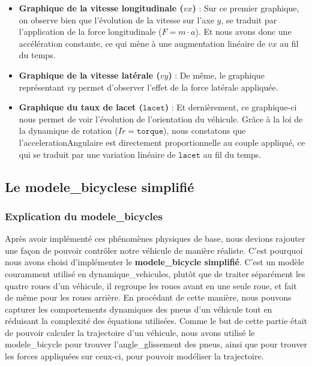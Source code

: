 \begin{itemize}
    \item \textbf{Graphique de la vitesse longitudinale ($vx$)} : Sur ce premier graphique, on observe bien que l'évolution de la vitesse sur l'axe $y$, se traduit par l'application de la force longitudinale ($ F = m \cdot a $).
    Et nous avons donc une accélération constante, ce qui mène à une augmentation linéaire de $vx$ au fil du temps.

    \item \textbf{Graphique de la vitesse latérale ($vy$)} : De même, le graphique représentant $vy$ permet d'observer l'effet de la force latérale appliquée.

    \item \textbf{Graphique du taux de lacet ({$\texttt{lacet}$})} : Et dernièrement, ce graphique-ci nous permet de voir l'évolution de l'orientation du véhicule.
    Grâce à la loi de la dynamique de rotation ($I\dot{r} = \texttt{torque}$), nous constatons que l'\gls{accelerationAngulaire} est directement proportionnelle au couple appliqué, ce qui se traduit par une variation linéaire de $\texttt{lacet}$ au fil du temps.
\end{itemize}

\subsection{Le \glspl{modele_bicycle}e simplifié}\label{subsec:le-modele-bicycle-simplifie}

\subsubsection{Explication du \glspl{modele_bicycle}}
Après avoir implémenté ces phénomènes physiques de base, nous devions rajouter une façon de pouvoir contrôler notre véhicule de manière réaliste.
C'est pourquoi nous avons choisi d'implémenter le \textbf{\gls{modele_bicycle} simplifié}.
C'est un modèle couramment utilisé en \glspl{dynamique_vehicule}, plutôt que de traiter séparément les quatre roues d'un véhicule, il regroupe les roues avant en une seule roue, et fait de même pour les roues arrière.
En procédant de cette manière, nous pouvons capturer les comportements dynamiques des pneus d'un véhicule tout en réduisant la complexité des équations utilisées.
Comme le but de cette partie était de pouvoir calculer la trajectoire d'un véhicule, nous avons utilisé le \gls{modele_bicycle} pour trouver l'\gls{angle_glissement} des pneus, ainsi que pour trouver les forces appliquées sur ceux-ci, pour pouvoir modéliser la trajectoire.

